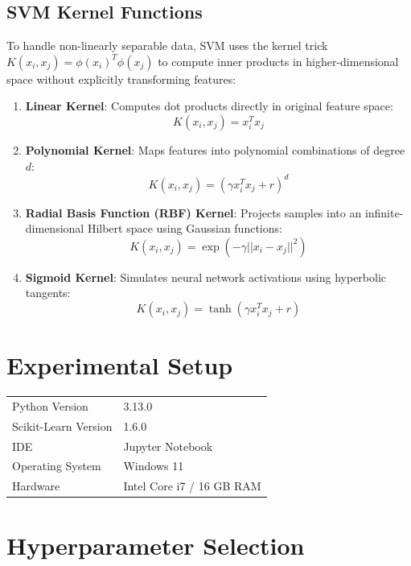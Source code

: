\documentclass[12pt,a4paper]{article}
\begin{document}
\subsection{SVM Kernel Functions}
To handle non-linearly separable data, SVM uses the kernel trick $K(x_i, x_j) = \phi(x_i)^T \phi(x_j)$ to compute inner products in higher-dimensional space without explicitly transforming features:
\begin{enumerate}
\item \textbf{Linear Kernel}: Computes dot products directly in original feature space:
\begin{equation}
K(x_i, x_j) = x_i^T x_j
\end{equation}
\item \textbf{Polynomial Kernel}: Maps features into polynomial combinations of degree $d$:
\begin{equation}
K(x_i, x_j) = (\gamma x_i^T x_j + r)^d
\end{equation}
\item \textbf{Radial Basis Function (RBF) Kernel}: Projects samples into an infinite-dimensional Hilbert space using Gaussian functions:
\begin{equation}
K(x_i, x_j) = \exp(-\gamma ||x_i - x_j||^2)
\end{equation}
\item \textbf{Sigmoid Kernel}: Simulates neural network activations using hyperbolic tangents:
\begin{equation}
K(x_i, x_j) = \tanh(\gamma x_i^T x_j + r)
\end{equation}
\end{enumerate}

\section{Experimental Setup}

\begin{tabular}{ll}
\toprule
Python Version & 3.13.0 \\
Scikit-Learn Version & 1.6.0 \\
IDE & Jupyter Notebook \\
Operating System & Windows 11 \\
Hardware & Intel Core i7 / 16 GB RAM \\
\bottomrule
\end{tabular}

\section{Hyperparameter Selection}
\end{document}
